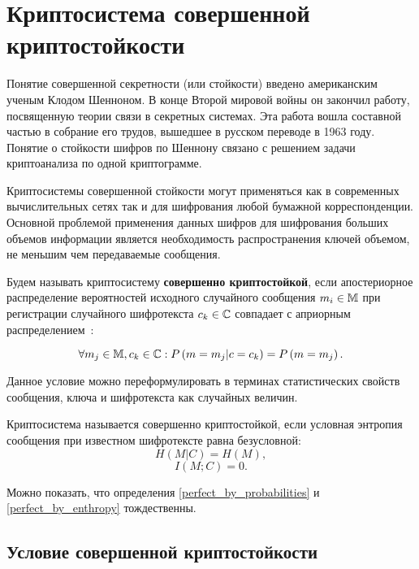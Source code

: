 \section[Совершеннная криптостойкость]{Криптосистема совершенной криптостойкости}

Понятие совершенной секретности (или стойкости) введено американским ученым Клодом Шенноном. В конце Второй мировой войны он закончил работу, посвященную теории связи в секретных системах\cite{Shannon:1949:CTS}. Эта работа вошла составной частью в собрание его трудов, вышедшее в русском переводе в 1963 году.~\cite{Shannon:1963} Понятие о стойкости шифров по Шеннону связано с решением задачи криптоанализа по одной криптограмме.

Криптосистемы совершенной стойкости могут применяться как в современных вычислительных сетях так и для шифрования любой бумажной корреспонденции. Основной проблемой применения данных шифров для шифрования больших объемов информации является необходимость распространения ключей объемом, не меньшим чем передаваемые сообщения.

\begin{definition}\label{perfect_by_probabilities}
Будем называть криптосистему \textbf{совершенно криптостойкой}, если апостериорное распределение вероятностей исходного случайного сообщения $m_i \in \mathbb{M}$ при регистрации случайного шифротекста $c_k \in \mathbb{C}$ совпадает с априорным распределением~\cite{Gultyaeva:2010}:

	\[\forall m_j \in \mathbb{M}, c_k \in \mathbb{C}: P \left( m = m_j | c = c_k \right) = P \left( m = m_j \right).\]
\end{definition}

Данное условие можно переформулировать в терминах статистических свойств сообщения, ключа и шифротекста как случайных величин.

\begin{definition}\label{perfect_by_enthropy}
Криптосистема называется совершенно криптостойкой, если условная энтропия сообщения при известном шифротексте равна безусловной:
	\[H \left( M | C \right) = H \left( M \right),\]
	\[I \left( M; C \right) = 0.\]
\end{definition}

Можно показать, что определения \ref{perfect_by_probabilities} и \ref{perfect_by_enthropy} тождественны.

\subsection{Условие совершенной криптостойкости}


